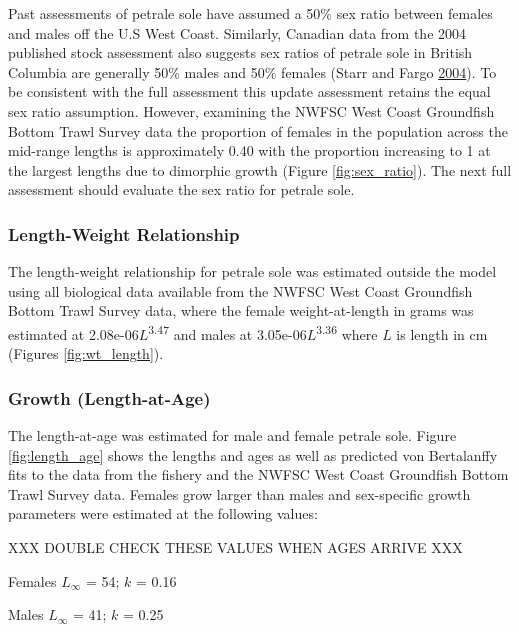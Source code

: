\documentclass[12pt,]{article}
\begin{document}
Past assessments of petrale sole have assumed a 50\% sex ratio between
females and males off the U.S West Coast. Similarly, Canadian data from
the 2004 published stock assessment also suggests sex ratios of petrale
sole in British Columbia are generally 50\% males and 50\% females
(Starr and Fargo \protect\hyperlink{ref-starr_petrale_2004}{2004}). To
be consistent with the full assessment this update assessment retains
the equal sex ratio assumption. However, examining the NWFSC West Coast
Groundfish Bottom Trawl Survey data the proportion of females in the
population across the mid-range lengths is approximately 0.40 with the
proportion increasing to 1 at the largest lengths due to dimorphic
growth (Figure \ref{fig:sex_ratio}). The next full assessment should
evaluate the sex ratio for petrale sole.

\subsubsection{Length-Weight
Relationship}\label{length-weight-relationship}

The length-weight relationship for petrale sole was estimated outside
the model using all biological data available from the NWFSC West Coast
Groundfish Bottom Trawl Survey data, where the female weight-at-length
in grams was estimated at 2.08e-06\(L\)\textsuperscript{3.47} and males
at 3.05e-06\(L\)\textsuperscript{3.36} where \(L\) is length in cm
(Figures \ref{fig:wt_length}).

\subsubsection{Growth (Length-at-Age)}\label{growth-length-at-age}

The length-at-age was estimated for male and female petrale sole. Figure
\ref{fig:length_age} shows the lengths and ages as well as predicted von
Bertalanffy fits to the data from the fishery and the NWFSC West Coast
Groundfish Bottom Trawl Survey data. Females grow larger than males and
sex-specific growth parameters were estimated at the following values:

XXX DOUBLE CHECK THESE VALUES WHEN AGES ARRIVE XXX

\begin{centering}

Females $L_{\infty}$ = 54; $k$ = 0.16

Males $L_{\infty}$ = 41; $k$ = 0.25

\end{centering}
\end{document}
